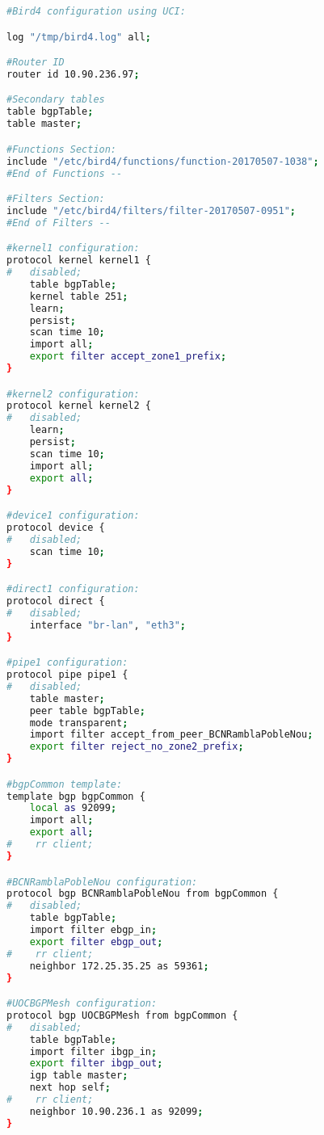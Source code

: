 \begin{lstlisting}[language=bash, caption={Birdc RAW Configuration}]
#Bird4 configuration using UCI:

log "/tmp/bird4.log" all;

#Router ID
router id 10.90.236.97;

#Secondary tables
table bgpTable;
table master;

#Functions Section:
include "/etc/bird4/functions/function-20170507-1038";
#End of Functions --

#Filters Section:
include "/etc/bird4/filters/filter-20170507-0951";
#End of Filters --

#kernel1 configuration:
protocol kernel kernel1 {
#   disabled;
    table bgpTable;
    kernel table 251;
    learn;
    persist;
    scan time 10;
    import all;
    export filter accept_zone1_prefix;
}

#kernel2 configuration:
protocol kernel kernel2 {
#   disabled;
    learn;
    persist;
    scan time 10;
    import all;
    export all;
}

#device1 configuration:
protocol device {
#   disabled;
    scan time 10;
}

#direct1 configuration:
protocol direct {
#   disabled;
    interface "br-lan", "eth3";
}

#pipe1 configuration:
protocol pipe pipe1 {
#   disabled;
    table master;
    peer table bgpTable;
    mode transparent;
    import filter accept_from_peer_BCNRamblaPobleNou;
    export filter reject_no_zone2_prefix;
}

#bgpCommon template:
template bgp bgpCommon {
    local as 92099;
    import all;
    export all;
#    rr client;
}

#BCNRamblaPobleNou configuration:
protocol bgp BCNRamblaPobleNou from bgpCommon {
#   disabled;
    table bgpTable;
    import filter ebgp_in;
    export filter ebgp_out;
#    rr client;
    neighbor 172.25.35.25 as 59361;
}

#UOCBGPMesh configuration:
protocol bgp UOCBGPMesh from bgpCommon {
#   disabled;
    table bgpTable;
    import filter ibgp_in;
    export filter ibgp_out;
    igp table master;
    next hop self;
#    rr client;
    neighbor 10.90.236.1 as 92099;
}
\end{lstlisting}